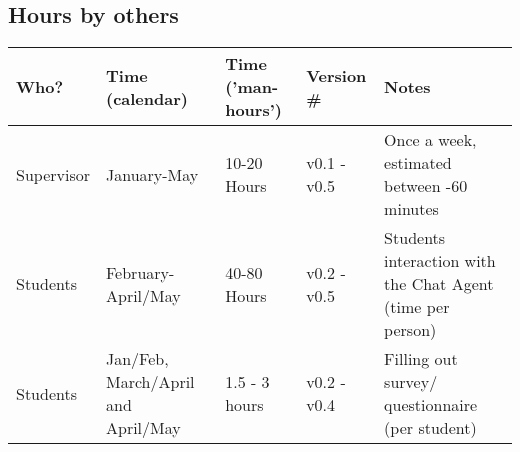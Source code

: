 \subsection{Hours by others}
\label{chapter5:hours_needed_by_others}
\begin{center}
	\begin{tabular}[H]{| p{4cm} | p{2.5cm} | l |  l | p{4cm}|}
		\hline
		Who? & Time (calendar) & Time ('man-hours')\footnotemark & Version \# & Notes  \\
		\hline
		Supervisor & January-May & 10-20 Hours & v0.1 - v0.5 & Once a week, \newline estimated between \newline 30-60 minutes \\ 
		\hline
		Students & February-April/May & 40-80 Hours & v0.2 - v0.5 & Students interaction \newline with the Chat Agent \newline (time per person) \\ 
		\hline
		Students & Jan/Feb, March/April and April/May & 1.5 - 3 hours & v0.2 - v0.4 & Filling out survey/ \newline questionnaire \newline (per student) \\ 
		\hline
	\end{tabular}
\end{center}
